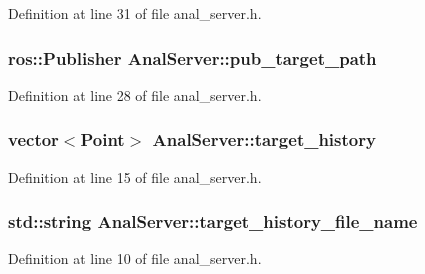 Definition at line 31 of file anal\+\_\+server.\+h.

\subsubsection[{\texorpdfstring{pub\+\_\+target\+\_\+path}{pub_target_path}}]{\setlength{\rightskip}{0pt plus 5cm}ros\+::\+Publisher Anal\+Server\+::pub\+\_\+target\+\_\+path}\hypertarget{class_anal_server_a96b1bbd4fbd27c527bfb5e5576dc9fcc}{}\label{class_anal_server_a96b1bbd4fbd27c527bfb5e5576dc9fcc}


Definition at line 28 of file anal\+\_\+server.\+h.

\subsubsection[{\texorpdfstring{target\+\_\+history}{target_history}}]{\setlength{\rightskip}{0pt plus 5cm}vector$<$Point$>$ Anal\+Server\+::target\+\_\+history}\hypertarget{class_anal_server_a1e7e665eb6e6d1ab8b81f1e632919a29}{}\label{class_anal_server_a1e7e665eb6e6d1ab8b81f1e632919a29}


Definition at line 15 of file anal\+\_\+server.\+h.

\subsubsection[{\texorpdfstring{target\+\_\+history\+\_\+file\+\_\+name}{target_history_file_name}}]{\setlength{\rightskip}{0pt plus 5cm}std\+::string Anal\+Server\+::target\+\_\+history\+\_\+file\+\_\+name}\hypertarget{class_anal_server_a8c43abe17071a7efb0859f21ed783b85}{}\label{class_anal_server_a8c43abe17071a7efb0859f21ed783b85}


Definition at line 10 of file anal\+\_\+server.\+h.

